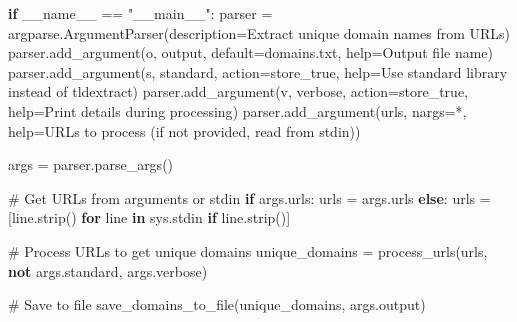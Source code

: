 \documentclass[
  titlepage]{article}
\newenvironment{Shaded}{\begin{snugshade}}{\end{snugshade}}
\newcommand{\BuiltInTok}[1]{\textcolor[rgb]{0.00,0.23,0.31}{#1}}
\newcommand{\CommentTok}[1]{\textcolor[rgb]{0.37,0.37,0.37}{#1}}
\newcommand{\ControlFlowTok}[1]{\textcolor[rgb]{0.00,0.23,0.31}{\textbf{#1}}}
\newcommand{\KeywordTok}[1]{\textcolor[rgb]{0.00,0.23,0.31}{\textbf{#1}}}
\newcommand{\NormalTok}[1]{\textcolor[rgb]{0.00,0.23,0.31}{#1}}
\newcommand{\OperatorTok}[1]{\textcolor[rgb]{0.37,0.37,0.37}{#1}}
\newcommand{\StringTok}[1]{\textcolor[rgb]{0.13,0.47,0.30}{#1}}
\newcommand{\VariableTok}[1]{\textcolor[rgb]{0.07,0.07,0.07}{#1}}
\begin{document}
\begin{Shaded}
\begin{Highlighting}[]
\ControlFlowTok{if} \VariableTok{\_\_name\_\_} \OperatorTok{==} \StringTok{"\_\_main\_\_"}\NormalTok{:}
\NormalTok{    parser }\OperatorTok{=}\NormalTok{ argparse.ArgumentParser(description}\OperatorTok{=}\StringTok{\textquotesingle{}Extract unique domain names from URLs\textquotesingle{}}\NormalTok{)}
\NormalTok{    parser.add\_argument(}\StringTok{\textquotesingle{}{-}o\textquotesingle{}}\NormalTok{, }\StringTok{\textquotesingle{}{-}{-}output\textquotesingle{}}\NormalTok{, default}\OperatorTok{=}\StringTok{\textquotesingle{}domains.txt\textquotesingle{}}\NormalTok{, }\BuiltInTok{help}\OperatorTok{=}\StringTok{\textquotesingle{}Output file name\textquotesingle{}}\NormalTok{)}
\NormalTok{    parser.add\_argument(}\StringTok{\textquotesingle{}{-}s\textquotesingle{}}\NormalTok{, }\StringTok{\textquotesingle{}{-}{-}standard\textquotesingle{}}\NormalTok{, action}\OperatorTok{=}\StringTok{\textquotesingle{}store\_true\textquotesingle{}}\NormalTok{, }\BuiltInTok{help}\OperatorTok{=}\StringTok{\textquotesingle{}Use standard library instead of tldextract\textquotesingle{}}\NormalTok{)}
\NormalTok{    parser.add\_argument(}\StringTok{\textquotesingle{}{-}v\textquotesingle{}}\NormalTok{, }\StringTok{\textquotesingle{}{-}{-}verbose\textquotesingle{}}\NormalTok{, action}\OperatorTok{=}\StringTok{\textquotesingle{}store\_true\textquotesingle{}}\NormalTok{, }\BuiltInTok{help}\OperatorTok{=}\StringTok{\textquotesingle{}Print details during processing\textquotesingle{}}\NormalTok{)}
\NormalTok{    parser.add\_argument(}\StringTok{\textquotesingle{}urls\textquotesingle{}}\NormalTok{, nargs}\OperatorTok{=}\StringTok{\textquotesingle{}*\textquotesingle{}}\NormalTok{, }\BuiltInTok{help}\OperatorTok{=}\StringTok{\textquotesingle{}URLs to process (if not provided, read from stdin)\textquotesingle{}}\NormalTok{)}
    
\NormalTok{    args }\OperatorTok{=}\NormalTok{ parser.parse\_args()}
    
    \CommentTok{\# Get URLs from arguments or stdin}
    \ControlFlowTok{if}\NormalTok{ args.urls:}
\NormalTok{        urls }\OperatorTok{=}\NormalTok{ args.urls}
    \ControlFlowTok{else}\NormalTok{:}
\NormalTok{        urls }\OperatorTok{=}\NormalTok{ [line.strip() }\ControlFlowTok{for}\NormalTok{ line }\KeywordTok{in}\NormalTok{ sys.stdin }\ControlFlowTok{if}\NormalTok{ line.strip()]}
    
    \CommentTok{\# Process URLs to get unique domains}
\NormalTok{    unique\_domains }\OperatorTok{=}\NormalTok{ process\_urls(urls, }\KeywordTok{not}\NormalTok{ args.standard, args.verbose)}
    
    \CommentTok{\# Save to file}
\NormalTok{    save\_domains\_to\_file(unique\_domains, args.output)}
\end{Highlighting}
\end{Shaded}
\end{document}
